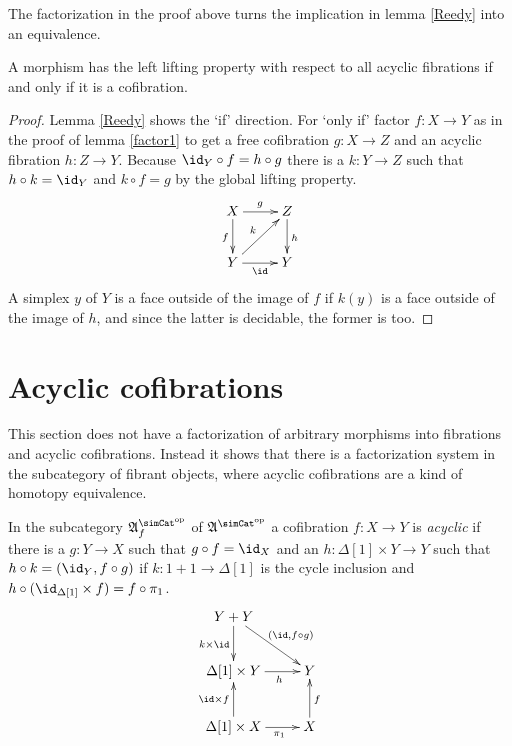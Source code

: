 \documentclass{tac}
\newcommand\hide[1]{}
\newcommand\dual{^{\mathrm{op}}}
\newcommand\s{^{\simCat\dual}}
\newcommand\of{:}
\newcommand\simplex\Delta
\newcommand\f{_f}
\newcommand\ambient{\mathfrak A}
\begin{document}
\hide{ In acyclic cofibrations the codomain may have a distance function, that gives an upper bound to the number of compositions required to to reach it. I don't have time to work that out and check it right now.
}

The factorization in the proof above turns the implication in lemma \ref{Reedy} into an equivalence.

\begin{proposition} A morphism has the left lifting property with respect to all acyclic fibrations if and only if it is a cofibration. \label{cofibration characterization} \end{proposition}

\begin{proof} Lemma \ref{Reedy} shows the `if' direction. For `only if' factor $f\of X\to Y$ as in the proof of lemma \ref{factor1} to get a free cofibration $g\of X\to Z$ and an acyclic fibration $h\of Z\to Y$. Because $\id_Y\circ f = h\circ g$ there is a $k\of Y\to Z$ such that $h\circ k = \id_Y$ and $k\circ f = g$ by the global lifting property. 
\[
\xymatrix{
X\ar[d]_f \ar[r]^g & Z\ar[d]^h\\
Y\ar[r]_\id \ar[ur]^k & Y
}
\]
A simplex $y$ of $Y$ is a face outside of the image of $f$ if $k(y)$ is a face outside of the image of $h$, and since the latter is decidable, the former is too.\end{proof}

\section{Acyclic cofibrations} %
This section does not have a factorization of arbitrary morphisms into fibrations and acyclic cofibrations. Instead it shows that there is a factorization system in the subcategory of fibrant objects, where acyclic cofibrations are a kind of homotopy equivalence.

\begin{definition} In the subcategory $\ambient\s\f$ of $\ambient\s$ a cofibration $f\of X\to Y$ is \emph{acyclic} if there is a $g\of Y\to X$ such that $g\circ f = \id_X$ and an $h\of \simplex[1]\times Y\to Y$ such that $h\circ k = (\id_Y,f\circ g)$ if $k\of 1+1\to\simplex[1]$ is the cycle inclusion and 
$h\circ (\id_{\simplex[1]}\times f) = f\circ\pi_1$.
\[\xymatrix{
Y+Y\ar[d]_{k\times \id} \ar[dr]^{(\id,f\circ g)}\\
\simplex[1]\times Y \ar[r]_(.6)h & Y\\
\simplex[1]\times X \ar[r]_(.6){\pi_1}\ar[u]^{\id\times f} & X\ar[u]_f\\
}\]\label{acyclic cofibration}
\end{definition}
\end{document}
